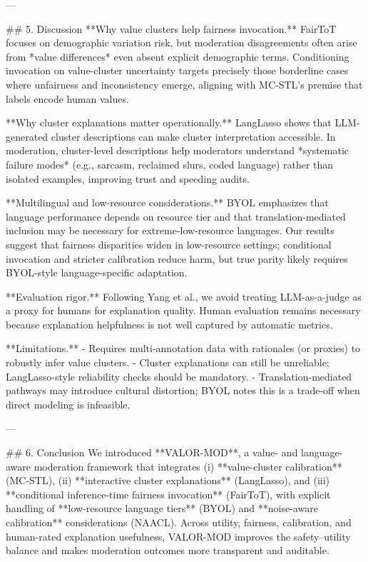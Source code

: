 ---

## 5. Discussion
**Why value clusters help fairness invocation.** FairToT focuses on demographic variation risk, but moderation disagreements often arise from *value differences* even absent explicit demographic terms. Conditioning invocation on value-cluster uncertainty targets precisely those borderline cases where unfairness and inconsistency emerge, aligning with MC‑STL’s premise that labels encode human values.

**Why cluster explanations matter operationally.** LangLasso shows that LLM-generated cluster descriptions can make cluster interpretation accessible. In moderation, cluster-level descriptions help moderators understand *systematic failure modes* (e.g., sarcasm, reclaimed slurs, coded language) rather than isolated examples, improving trust and speeding audits.

**Multilingual and low-resource considerations.** BYOL emphasizes that language performance depends on resource tier and that translation-mediated inclusion may be necessary for extreme-low-resource languages. Our results suggest that fairness disparities widen in low-resource settings; conditional invocation and stricter calibration reduce harm, but true parity likely requires BYOL-style language-specific adaptation.

**Evaluation rigor.** Following Yang et al., we avoid treating LLM-as-a-judge as a proxy for humans for explanation quality. Human evaluation remains necessary because explanation helpfulness is not well captured by automatic metrics.

**Limitations.**
- Requires multi-annotation data with rationales (or proxies) to robustly infer value clusters.
- Cluster explanations can still be unreliable; LangLasso-style reliability checks should be mandatory.
- Translation-mediated pathways may introduce cultural distortion; BYOL notes this is a trade-off when direct modeling is infeasible.

---

## 6. Conclusion
We introduced **VALOR-MOD**, a value- and language-aware moderation framework that integrates (i) **value-cluster calibration** (MC‑STL), (ii) **interactive cluster explanations** (LangLasso), and (iii) **conditional inference-time fairness invocation** (FairToT), with explicit handling of **low-resource language tiers** (BYOL) and **noise-aware calibration** considerations (NAACL). Across utility, fairness, calibration, and human-rated explanation usefulness, VALOR-MOD improves the safety–utility balance and makes moderation outcomes more transparent and auditable.

